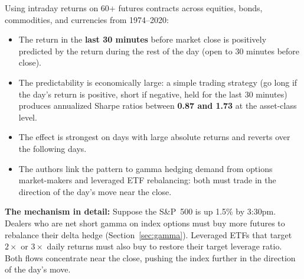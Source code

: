 \begin{keyresult}
Using intraday returns on 60+ futures contracts across equities,
bonds, commodities, and currencies from 1974--2020:
\begin{itemize}[nosep]
  \item The return in the \textbf{last 30 minutes} before market
        close is positively predicted by the return during the
        rest of the day (open to 30 minutes before close).
  \item The predictability is economically large: a simple trading
        strategy (go long if the day's return is positive, short if
        negative, held for the last 30 minutes) produces annualized
        Sharpe ratios between \textbf{0.87 and 1.73} at the
        asset-class level.
  \item The effect is strongest on days with large absolute returns
        and reverts over the following days.
  \item The authors link the pattern to gamma hedging demand from
        options market-makers and leveraged ETF rebalancing: both
        must trade in the direction of the day's move near the close.
\end{itemize}
\end{keyresult}

\textbf{The mechanism in detail:}  Suppose the S\&P~500 is up 1.5\%
by 3:30pm.  Dealers who are net short gamma on index options must buy
more futures to rebalance their delta hedge (Section~\ref{sec:gamma}).
Leveraged ETFs that target $2\times$ or $3\times$ daily returns must
also buy to restore their target leverage ratio.  Both flows
concentrate near the close, pushing the index further in the
direction of the day's move.

